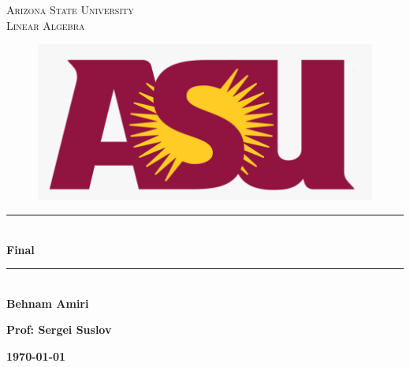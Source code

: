 \documentclass[fleqn]{article}
\begin{document}
  \begin{titlepage}

    \newcommand{\HRule}{\rule{\linewidth}{0.5mm}}

    \center


    \textsc{\LARGE Arizona State University}\\[1.5cm]

    \textsc{\LARGE Linear Algebra }\\[1.5cm]


    \begin{figure}
      \includegraphics[width=\linewidth]{asu.png}
    \end{figure}


    \HRule \\[0.4cm]
    { \huge \bfseries Final}\\[0.4cm] 
    \HRule \\[1.5cm]

    \textbf{Behnam Amiri}

    \bigbreak

    \textbf{Prof: Sergei Suslov}

    \bigbreak


    \textbf{{\large \today}\\[2cm]}

    \vfill

  \end{titlepage}
\end{document}
